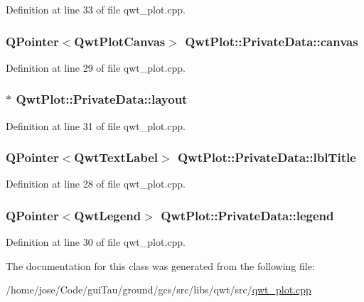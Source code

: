 Definition at line 33 of file qwt\-\_\-plot.\-cpp.

\hypertarget{class_qwt_plot_1_1_private_data_ab64ee9b853c86d7be2b6da8342e95e00}{
\subsubsection[{canvas}]{\setlength{\rightskip}{0pt plus 5cm}Q\-Pointer$<${\bf Qwt\-Plot\-Canvas}$>$ Qwt\-Plot\-::\-Private\-Data\-::canvas}}\label{class_qwt_plot_1_1_private_data_ab64ee9b853c86d7be2b6da8342e95e00}


Definition at line 29 of file qwt\-\_\-plot.\-cpp.

\hypertarget{class_qwt_plot_1_1_private_data_a457da2247f4c47e25f9b172992a5468f}{
\subsubsection[{layout}]{$\ast$ Qwt\-Plot\-::\-Private\-Data\-::layout}}\label{class_qwt_plot_1_1_private_data_a457da2247f4c47e25f9b172992a5468f}


Definition at line 31 of file qwt\-\_\-plot.\-cpp.

\hypertarget{class_qwt_plot_1_1_private_data_a0694a424d36caf341c4a2095e9fe137b}{
\subsubsection[{lbl\-Title}]{\setlength{\rightskip}{0pt plus 5cm}Q\-Pointer$<${\bf Qwt\-Text\-Label}$>$ Qwt\-Plot\-::\-Private\-Data\-::lbl\-Title}}\label{class_qwt_plot_1_1_private_data_a0694a424d36caf341c4a2095e9fe137b}


Definition at line 28 of file qwt\-\_\-plot.\-cpp.

\hypertarget{class_qwt_plot_1_1_private_data_a301a5243bda218bace525cfa7e8c6195}{
\subsubsection[{legend}]{\setlength{\rightskip}{0pt plus 5cm}Q\-Pointer$<${\bf Qwt\-Legend}$>$ Qwt\-Plot\-::\-Private\-Data\-::legend}}\label{class_qwt_plot_1_1_private_data_a301a5243bda218bace525cfa7e8c6195}


Definition at line 30 of file qwt\-\_\-plot.\-cpp.



The documentation for this class was generated from the following file\-:\begin{DoxyCompactItemize}
\item 
/home/jose/\-Code/gui\-Tau/ground/gcs/src/libs/qwt/src/\hyperlink{qwt__plot_8cpp}{qwt\-\_\-plot.\-cpp}\end{DoxyCompactItemize}
